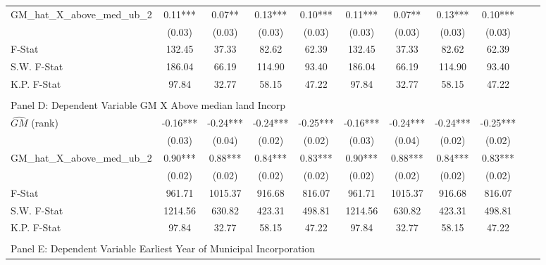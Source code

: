 \begin{table}[htbp]
\begin{threeparttable}
\begin{tabular}{l*{10}{c}}
\addlinespace
GM\_hat\_X\_above\_med\_ub\_2&       0.11***&       0.07** &       0.13***&       0.10***&       0.11***&       0.07** &       0.13***&       0.10***\\
                &     (0.03)   &     (0.03)   &     (0.03)   &     (0.03)   &     (0.03)   &     (0.03)   &     (0.03)   &     (0.03)   \\
\midrule
F-Stat          &     132.45   &      37.33   &      82.62   &      62.39   &     132.45   &      37.33   &      82.62   &      62.39   \\
S.W. F-Stat     &     186.04   &      66.19   &     114.90   &      93.40   &     186.04   &      66.19   &     114.90   &      93.40   \\
K.P. F-Stat     &      97.84   &      32.77   &      58.15   &      47.22   &      97.84   &      32.77   &      58.15   &      47.22   \\
\cmidrule[\heavyrulewidth](lr){1-9} \\ \cmidrule[\heavyrulewidth](lr){1-9}
\multicolumn{8}{l}{Panel D: Dependent Variable GM X Above median land Incorp}\\
\cmidrule(lr){1-9}
$\hat{GM}$ (rank)&      -0.16***&      -0.24***&      -0.24***&      -0.25***&      -0.16***&      -0.24***&      -0.24***&      -0.25***\\
                &     (0.03)   &     (0.04)   &     (0.02)   &     (0.02)   &     (0.03)   &     (0.04)   &     (0.02)   &     (0.02)   \\
\addlinespace
GM\_hat\_X\_above\_med\_ub\_2&       0.90***&       0.88***&       0.84***&       0.83***&       0.90***&       0.88***&       0.84***&       0.83***\\
                &     (0.02)   &     (0.02)   &     (0.02)   &     (0.02)   &     (0.02)   &     (0.02)   &     (0.02)   &     (0.02)   \\
\midrule
F-Stat          &     961.71   &    1015.37   &     916.68   &     816.07   &     961.71   &    1015.37   &     916.68   &     816.07   \\
S.W. F-Stat     &    1214.56   &     630.82   &     423.31   &     498.81   &    1214.56   &     630.82   &     423.31   &     498.81   \\
K.P. F-Stat     &      97.84   &      32.77   &      58.15   &      47.22   &      97.84   &      32.77   &      58.15   &      47.22   \\
\cmidrule[\heavyrulewidth](lr){1-9} \\ \cmidrule[\heavyrulewidth](lr){1-9}
\multicolumn{8}{l}{Panel E: Dependent Variable Earliest Year of Municipal Incorporation}\\

\end{tabular}
\end{threeparttable}
\end{table}
